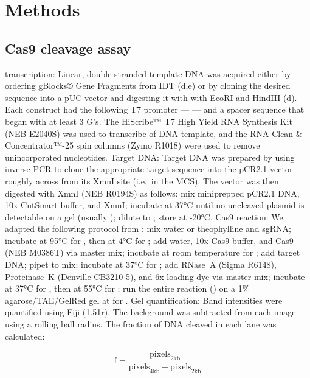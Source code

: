 \documentclass[10pt,oneside]{article}
\begin{document}
\section{Methods}

\subsection{\Invitro{} Cas9 cleavage assay}

\Invitro{} transcription: Linear, double-stranded template DNA was acquired either by ordering gBlocks® Gene Fragments from IDT (d,e) or by cloning the desired sequence into a pUC vector and digesting it with with EcoRI and HindIII (d).  Each construct had the following T7 promoter ---  --- and a spacer sequence that began with at least 3 G's.  The HiScribe™ T7 High Yield RNA Synthesis Kit (NEB E2040S) was used to transcribe  of DNA template, and the RNA Clean \& Con\-cen\-trator™-25 spin columns (Zymo R1018) were used to remove unincorporated nucleotides.  Target DNA: Target DNA was prepared by using inverse PCR to clone the appropriate target sequence into the pCR2.1 vector roughly across from its XmnI site (i.e.\ in the MCS).  The vector was then digested with XmnI (NEB R0194S) as follows: mix   miniprepped pCR2.1 DNA,  10x CutSmart buffer, and   XmnI; incubate at 37°C until no uncleaved plasmid is detectable on a gel (usually ); dilute to ; store at -20°C.  Cas9 reaction: We adapted the following protocol from : mix  water or  theophylline and   sgRNA; incubate at 95°C for , then at 4°C for ; add  water,  10x Cas9 buffer, and   Cas9 (NEB M0386T) via master mix; incubate at room temperature for ; add   target DNA; pipet to mix; incubate at 37°C for ; add   RNase~A (Sigma R6148),   Proteinase~K (Denville CB3210-5), and  6x loading dye via master mix; incubate at 37°C for , then at 55°C for ; run the entire reaction () on a 1\% agarose/TAE/GelRed gel at  for .  Gel quantification: Band intensities were quantified using Fiji (1.51r).  The background was subtracted from each image using a  rolling ball radius.  The fraction of DNA cleaved in each lane was calculated:

\begin{displaymath}
 \mathrm{f} = \frac{\mathrm{pixels}_\mathrm{2kb}}{\mathrm{pixels}_\mathrm{4kb} + \mathrm{pixels}_\mathrm{2kb}}
\end{displaymath}
\end{document}
